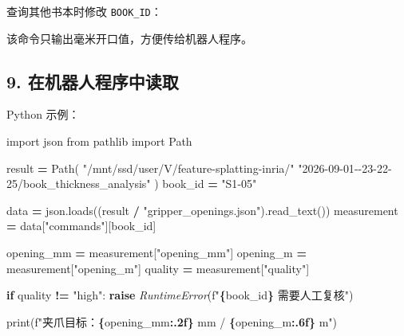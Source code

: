 \documentclass[
  chinese,
  11pt,
  a4paper,
]{article}
\newenvironment{Shaded}{\begin{snugshade}}{\end{snugshade}}
\newcommand{\AttributeTok}[1]{\textcolor[rgb]{0.13,0.29,0.53}{#1}}
\newcommand{\BuiltInTok}[1]{#1}
\newcommand{\ControlFlowTok}[1]{\textcolor[rgb]{0.13,0.29,0.53}{\textbf{#1}}}
\newcommand{\ImportTok}[1]{#1}
\newcommand{\NormalTok}[1]{#1}
\newcommand{\OperatorTok}[1]{\textcolor[rgb]{0.81,0.36,0.00}{\textbf{#1}}}
\newcommand{\PreprocessorTok}[1]{\textcolor[rgb]{0.56,0.35,0.01}{\textit{#1}}}
\newcommand{\SpecialCharTok}[1]{\textcolor[rgb]{0.81,0.36,0.00}{\textbf{#1}}}
\newcommand{\SpecialStringTok}[1]{\textcolor[rgb]{0.31,0.60,0.02}{#1}}
\newcommand{\StringTok}[1]{\textcolor[rgb]{0.31,0.60,0.02}{#1}}
\newcommand{\VariableTok}[1]{\textcolor[rgb]{0.00,0.00,0.00}{#1}}
\begin{document}
查询其他书本时修改 \texttt{BOOK\_ID}：

\begin{Shaded}
\end{Shaded}

该命令只输出毫米开口值，方便传给机器人程序。

\subsection{9.
在机器人程序中读取}\label{9-ux5728ux673aux5668ux4ebaux7a0bux5e8fux4e2dux8bfbux53d6}

Python 示例：

\begin{Shaded}
\begin{Highlighting}[]
\ImportTok{import}\NormalTok{ json}
\ImportTok{from}\NormalTok{ pathlib }\ImportTok{import}\NormalTok{ Path}

\NormalTok{result }\OperatorTok{=}\NormalTok{ Path(}
    \StringTok{"/mnt/ssd/user/V/feature{-}splatting{-}inria/"}
    \StringTok{"2026{-}09{-}01{-}{-}23{-}22{-}25/book\_thickness\_analysis"}
\NormalTok{)}
\NormalTok{book\_id }\OperatorTok{=} \StringTok{"S1{-}05"}

\NormalTok{data }\OperatorTok{=}\NormalTok{ json.loads((result }\OperatorTok{/} \StringTok{"gripper\_openings.json"}\NormalTok{).read\_text())}
\NormalTok{measurement }\OperatorTok{=}\NormalTok{ data[}\StringTok{"commands"}\NormalTok{][book\_id]}

\NormalTok{opening\_mm }\OperatorTok{=}\NormalTok{ measurement[}\StringTok{"opening\_mm"}\NormalTok{]}
\NormalTok{opening\_m }\OperatorTok{=}\NormalTok{ measurement[}\StringTok{"opening\_m"}\NormalTok{]}
\NormalTok{quality }\OperatorTok{=}\NormalTok{ measurement[}\StringTok{"quality"}\NormalTok{]}

\ControlFlowTok{if}\NormalTok{ quality }\OperatorTok{!=} \StringTok{"high"}\NormalTok{:}
    \ControlFlowTok{raise} \PreprocessorTok{RuntimeError}\NormalTok{(}\SpecialStringTok{f"}\SpecialCharTok{\{}\NormalTok{book\_id}\SpecialCharTok{\}}\SpecialStringTok{ 需要人工复核"}\NormalTok{)}

\BuiltInTok{print}\NormalTok{(}\SpecialStringTok{f"夹爪目标：}\SpecialCharTok{\{}\NormalTok{opening\_mm}\SpecialCharTok{:.2f\}}\SpecialStringTok{ mm / }\SpecialCharTok{\{}\NormalTok{opening\_m}\SpecialCharTok{:.6f\}}\SpecialStringTok{ m"}\NormalTok{)}
\end{Highlighting}
\end{Shaded}
\end{document}
